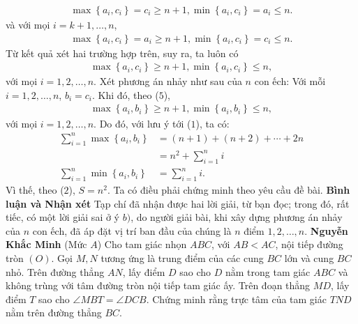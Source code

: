 \begin{multicols}{2}
\begin{align*}
		\max \!\left\{\! {{a_i},{c_i}} \!\right\} \!=\! {c_i} \!\ge\! n \!+\! 1, \min\! \left\{ \!{{a_i},{c_i}} \!\right\} \!=\! {a_i} \!\le\! n.
	\end{align*}
	và với mọi $i = k + 1, \ldots , n$,
	\begin{align*}
		\max\! \left\{\! {{a_i},{c_i}} \!\right\} \!=\! {a_i} \!\ge\! n \!+\! 1, \min\! \left\{\! {{a_i},{c_i}} \!\right\} \!=\! {c_i} \!\le\! n.
	\end{align*}
	Từ kết quả xét hai trường hợp trên, suy ra, ta luôn có
	\begin{align*}
		\max \!\left\{\! {{a_i},{c_i}} \!\right\} \!\ge\! n \!+\! 1,\min\! \left\{\! {{a_i},{c_i}} \!\right\} \!\le\! n, \tag{$5$}
	\end{align*}
	với mọi $i = 1, 2, \ldots, n$.
	\vskip 0.05cm
	Xét phương án nhảy như sau của $n$ con ếch: Với mỗi $i = 1, 2, \ldots, n$, $b_i = c_i$.
	\vskip 0.05cm  
	Khi đó, theo ($5$),
	\begin{align*}
		\max \!\left\{\! {{a_i},{b_i}} \!\right\} \!\ge\! n \!+\! 1,\min\! \left\{\! {{a_i},{b_i}} \!\right\} \!\le\! n,
	\end{align*}
	với mọi $i = 1, 2, \ldots , n$.
	\vskip 0.05cm
	Do đó, với lưu ý tới ($1$), ta có:
	\begin{align*}
		\sum\limits_{i = 1}^n {\max \left\{ {{a_i},{b_i}} \right\}}  &= \left( {n \!+\! 1} \right) \!+\! \left( {n \!+\! 2} \right) \!+\!  \cdots \! +\! 2n \\[-1.2ex]
		&= {n^2} + \sum\limits_{i = 1}^n i\\[-1.2ex]
		\sum\limits_{i = 1}^n {\min \left\{ {{a_i},{b_i}} \right\}}  &= \sum\limits_{i = 1}^n i.
	\end{align*}
	Vì thế, theo ($2$), $S = n^2$.
	\vskip 0.05cm  
	Ta có điều phải chứng minh theo yêu cầu đề bài.
	\vskip 0.05cm
	\textbf{\color{thachthuctoanhoc}Bình luận và Nhận xét}
	\vskip 0.05cm
	Tạp chí đã nhận được hai lời giải, từ bạn đọc; trong đó, rất tiếc, có một lời giải sai ở ý $b)$, do người giải bài, khi xây dựng phương án nhảy của $n$ con ếch, đã áp đặt vị trí ban đầu của chúng là $n$ điểm $1, 2, \ldots, n$.
	\vskip 0.05cm
	\hfill	\textbf{\color{thachthuctoanhoc}Nguyễn Khắc Minh}
	\vskip 0.05cm
	{}
	(Mức $A$) Cho tam giác nhọn $ABC$, với $AB<AC$, nội tiếp đường tròn $(O)$. Gọi $M,N$ tương ứng là trung điểm của các cung $BC$ lớn và cung $BC$ nhỏ. Trên đường thẳng $AN$, lấy điểm $D$ sao cho $D$ nằm trong tam giác $ABC$ và không trùng với tâm đường tròn nội tiếp tam giác ấy. Trên đoạn thẳng $MD$, lấy điểm $T$ sao cho $\angle{MBT}=\angle{DCB}$. Chứng minh rằng trực tâm của tam giác $TND$ nằm trên đường thẳng $BC$.

\end{multicols}
